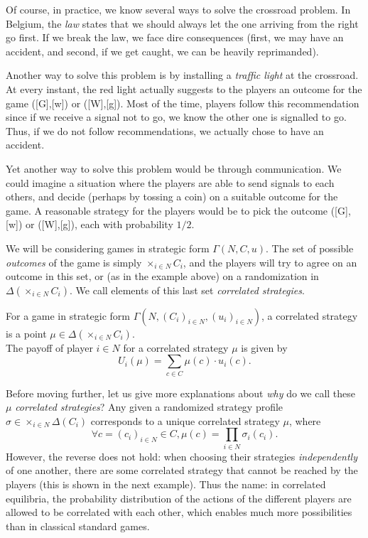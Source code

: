 \begin{example}
Of course, in practice, we know several ways to solve the crossroad problem. In Belgium, the \emph{law} states that we should always let the one arriving from the right go first. If we break the law, we face dire consequences (first, we may have an accident, and second, if we get caught, we can be heavily reprimanded).

Another way to solve this problem is by installing a \emph{traffic light} at the crossroad. At every instant, the red light actually suggests to the players an outcome for the game ([G],[w]) or ([W],[g]). Most of the time, players follow this recommendation since if we receive a signal not to go, we know the other one is signalled to go. Thus, if we do not follow recommendations, we actually chose to have an accident.

Yet another way to solve this problem would be through communication. We could imagine a situation where the players are able to send signals to each others, and decide (perhaps by tossing a coin) on a suitable outcome for the game. A reasonable strategy for the players would be to pick the outcome ([G],[w]) or ([W],[g]), each with probability $1/2$.

\label{ch5:example:crossroads1}
\end{example}

We will be considering games in strategic form $\Gamma(N,C,u)$. The set of possible \emph{outcomes} of the game is simply $\times_{i \in N} C_i$, and the players will try to agree on an outcome in this set, or (as in the example above) on a randomization in $\Delta (\times_{i \in N} C_i)$. We call elements of this last set \emph{correlated strategies}.

\begin{definition}
For a game in strategic form $\Gamma(N,(C_i)_{i \in N}, (u_i)_{i \in N})$, a correlated strategy is a point $\mu \in \Delta (\times_{i \in N} C_i)$. \\
The payoff of player $i \in N$ for a correlated strategy $\mu$ is given by 
$$U_i(\mu) = \sum_{c \in C} \mu(c) \cdot u_i(c).$$
\end{definition}

Before moving further, let us give more explanations about \emph{why} do we call these $\mu$ \emph{correlated strategies}? 
Any given a randomized strategy profile $\sigma \in \times_{i \in N} \Delta(C_i)$ corresponds to a unique correlated strategy $\mu$, where 
$$\forall c = (c_i)_{i \in N} \in C, \mu(c) = \prod_{i \in N} \sigma_i(c_i). $$
However, the reverse does not hold: when choosing their strategies \emph{independently} of one another,  there are some correlated strategy that cannot be reached by the players (this is shown in the next example). Thus the name: in correlated equilibria, the probability distribution of the actions of the different players are allowed to be correlated with each other, which enables much more possibilities than in classical standard games.

